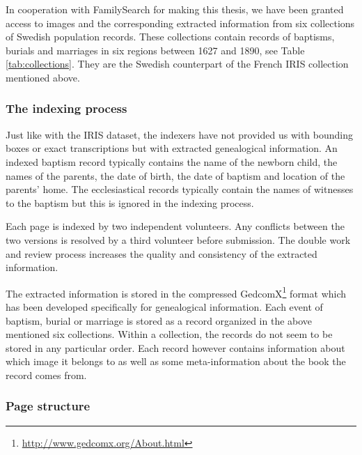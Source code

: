 

In cooperation with FamilySearch for making this thesis, we have been granted access to images and the corresponding extracted information from six collections of Swedish population records.
These collections contain records of baptisms, burials and marriages in six regions between 1627 and 1890, see Table \ref{tab:collections}. They are the Swedish counterpart of the French IRIS collection mentioned above.

\subsubsection{The indexing process}

Just like with the IRIS dataset, the indexers have not provided us with bounding boxes or exact transcriptions but with extracted genealogical information. An indexed baptism record typically contains the name of the newborn child, the names of the parents, the date of birth, the date of baptism and location of the parents' home. The ecclesiastical records typically contain the names of witnesses to the baptism but this is ignored in the indexing process.

Each page is indexed by two independent volunteers. Any conflicts between the two versions is resolved by a third volunteer before submission.
The double work and review process increases the quality and consistency of the extracted information.

The extracted information is stored in the compressed GedcomX\footnote{\url{http://www.gedcomx.org/About.html}} format which has been developed specifically for genealogical information.
Each event of baptism, burial or marriage is stored as a record organized in the above mentioned six collections. Within a collection, the records do not seem to be stored in any particular order. Each record however contains information about which image it belongs to as well as some meta-information about the book the record comes from.


\subsubsection{Page structure}


